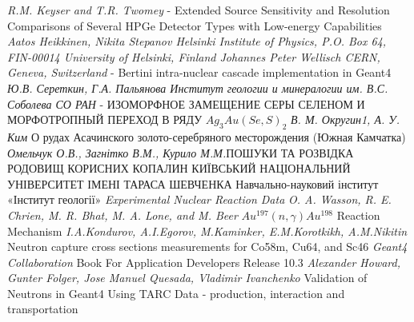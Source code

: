 \documentclass[a4paper, 14pt]{article}
\numberwithin{equation}{section}
\numberwithin{table}{section}
\begin{document}
\pagebreak
\newpage	
\begin{thebibliography}{}
	
	 \textit{R.M. Keyser and T.R. Twomey} - Extended Source Sensitivity and Resolution Comparisons of Several HPGe Detector Types with Low-energy Capabilities 
	 \textit{Aatos Heikkinen, Nikita Stepanov Helsinki Institute of Physics, P.O. Box 64, FIN-00014 University of Helsinki, Finland Johannes Peter Wellisch CERN, Geneva, Switzerland} - Bertini intra-nuclear cascade implementation in Geant4 
	 \textit{Ю.В. Сереткин, Г.А. Пальянова Институт геологии и минералогии им. В.С. Соболева СО РАН} - ИЗОМОРФНОЕ ЗАМЕЩЕНИЕ СЕРЫ СЕЛЕНОМ И МОРФОТРОПНЫЙ ПЕРЕХОД В РЯДУ $Ag_3Au(Se,S)_2$ 	
	 \textit{В. М. Округин1, А. У. Ким} О рудах Асачинского золото-серебряного месторождения
	(Южная Камчатка)
	 \textit{Омельчук О.В., Загнітко В.М., Курило М.М.}ПОШУКИ ТА РОЗВІДКА РОДОВИЩ КОРИСНИХ КОПАЛИН КИЇВСЬКИЙ НАЦІОНАЛЬНИЙ УНІВЕРСИТЕТ ІМЕНІ ТАРАСА ШЕВЧЕНКА Навчально-науковий інститут «Інститут геології»
	 \textit{Experimental Nuclear Reaction Data}
	 \textit{O. A. Wasson, R. E. Chrien, M. R. Bhat, M. A. Lone, and M. Beer} $Au^{197}(n, \gamma)Au^{198}$ Reaction Mechanism 
	 \textit{	I.A.Kondurov, A.I.Egorov, M.Kaminker, E.M.Korotkikh, A.M.Nikitin}  Neutron capture cross sections measurements for Co58m, Cu64, and Sc46
	 \textit{ Geant4 Collaboration } Book For Application Developers
	Release 10.3
	 \textit{ Alexander Howard, Gunter Folger, Jose Manuel Quesada, Vladimir Ivanchenko} Validation of Neutrons in Geant4 Using TARC Data - production, interaction and transportation

\end{thebibliography}
\end{document}
